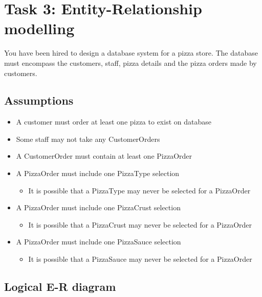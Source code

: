 \newpage
\section{Task 3: Entity-Relationship modelling}

You have been hired to design a database system for a pizza store. The database must encompass the customers, staff, pizza details and the pizza orders made by customers.

\subsection{Assumptions}

\begin{itemize}
\item A customer must order at least one pizza to exist on database
\item Some staff may not take any CustomerOrders
\item A CustomerOrder must contain at least one PizzaOrder
\item A PizzaOrder must include one PizzaType selection
	\begin{itemize}
	\item It is possible that a PizzaType may never be selected for a PizzaOrder
	\end{itemize}
\item A PizzaOrder must include one PizzaCrust selection
	\begin{itemize}
	\item It is possible that a PizzaCrust may never be selected for a PizzaOrder
	\end{itemize}
\item A PizzaOrder must include one PizzaSauce selection
	\begin{itemize}
	\item It is possible that a PizzaSauce may never be selected for a PizzaOrder
	\end{itemize}
\end{itemize}

\subsection{Logical E-R diagram}


